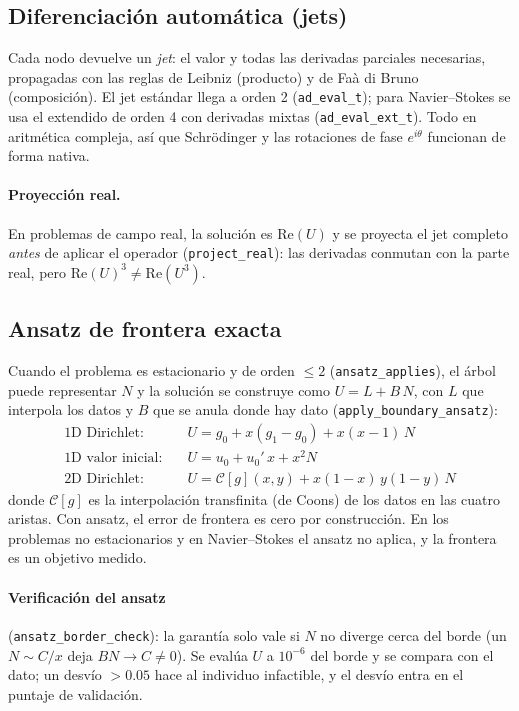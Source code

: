 \documentclass[11pt,a4paper]{article}
\newcommand{\code}[1]{\texttt{\small #1}}
\begin{document}
\subsection{Diferenciación automática (jets)}
Cada nodo devuelve un \emph{jet}: el valor y todas las derivadas parciales necesarias, propagadas con las
reglas de Leibniz (producto) y de Faà di Bruno (composición). El jet estándar llega a orden 2
(\code{ad\_eval\_t}); para Navier--Stokes se usa el extendido de orden 4 con derivadas mixtas
(\code{ad\_eval\_ext\_t}). Todo en aritmética compleja, así que Schrödinger y las rotaciones de fase
$e^{i\theta}$ funcionan de forma nativa.

\paragraph{Proyección real.} En problemas de campo real, la solución es $\mathrm{Re}(U)$ y se proyecta el
jet completo \emph{antes} de aplicar el operador (\code{project\_real}): las derivadas conmutan con la
parte real, pero $\mathrm{Re}(U)^3\ne\mathrm{Re}(U^3)$.

\subsection{Ansatz de frontera exacta}
Cuando el problema es estacionario y de orden $\le2$ (\code{ansatz\_applies}), el árbol puede representar
$N$ y la solución se construye como $U = L + B\,N$, con $L$ que interpola los datos y $B$ que se anula
donde hay dato (\code{apply\_boundary\_ansatz}):
\begin{align*}
\text{1D Dirichlet:}\quad & U = g_0 + x(g_1-g_0) + x(x-1)\,N\\
\text{1D valor inicial:}\quad & U = u_0 + u_0'\,x + x^2 N\\
\text{2D Dirichlet:}\quad & U = \mathcal C[g](x,y) + x(1-x)\,y(1-y)\,N
\end{align*}
donde $\mathcal C[g]$ es la interpolación transfinita (de Coons) de los datos en las cuatro aristas. Con
ansatz, el error de frontera es cero por construcción. En los problemas no estacionarios y en
Navier--Stokes el ansatz no aplica, y la frontera es un objetivo medido.

\paragraph{Verificación del ansatz} (\code{ansatz\_border\_check}): la garantía solo vale si $N$ no
diverge cerca del borde (un $N\sim C/x$ deja $BN\to C\ne0$). Se evalúa $U$ a $10^{-6}$ del borde y se
compara con el dato; un desvío $>0.05$ hace al individuo infactible, y el desvío entra en el puntaje de
validación.
\end{document}

